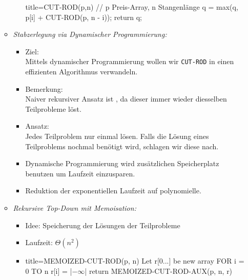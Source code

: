 \documentclass[
    12pt,
    a4paper,
    ngerman,
    color=3b,%
    marginpar=false,
    colorback=false,
    leqno,
]{tudaexercise}
\begin{document}
\begin{itemize}
\begin{itemize}
\begin{itemize}
\begin{ccode}[autogobble,escapeinside=||]{title={CUT-ROD(p,n)    // p Preis-Array, n Stangenlänge}}
                                q = max(q, p[i] + CUT-ROD(p, n - i));
                            return q;
                            \end{ccode}
                    \end{itemize}
                \item \textit{Stabzerlegung via Dynamischer Programmierung:}
                    \begin{itemize}
                        \item Ziel: \\
                                Mittels dynamischer Programmierung wollen wir \texttt{CUT-ROD} in einen effizienten
                                Algorithmus verwandeln.
                        \item Bemerkung: \\
                                Naiver rekursiver Ansatz ist , da dieser immer wieder diesselben 
                                Teilprobleme löst.
                        \item Ansatz: \\
                                Jedes Teilproblem nur einmal lösen. Falls die Lösung eines Teilproblems nochmal benötigt
                                wird, schlagen wir diese nach.
                        \item Dynamische Programmierung wird zusätzlichen Speicherplatz benutzen um Laufzeit einzusparen.
                        \item Reduktion der exponentiellen Laufzeit auf polynomielle.
                    \end{itemize}
                \item \textit{Rekursive Top-Down mit Memoisation:}
                    \begin{itemize}
                        \item Idee: Speicherung der Lösungen der Teilprobleme
                        \item Laufzeit: $\Theta(n^2)$
                        \item[]
                            \begin{ccode}[autogobble,escapeinside=||]{title={MEMOIZED-CUT-ROD(p, n)}}
                            Let r[0...] be new array
                            FOR i = 0 TO n
                                r[i] = |$-\infty$|
                            return MEMOIZED-CUT-ROD-AUX(p, n, r)
                        \end{ccode}

\end{itemize}
\end{itemize}
\end{itemize}
\end{document}

